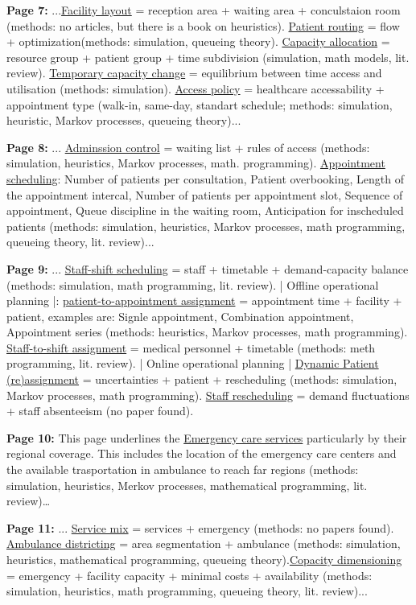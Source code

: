     \textbf{Page 7:}
    ...\underline{Facility layout} = reception area + waiting area + conculstaion room (methods: no articles, but there is a book on heuristics). \underline{Patient routing} = flow + optimization(methods: simulation, queueing theory). \underline{Capacity allocation} = resource group + patient group + time subdivision (simulation, math models, lit. review). \underline{Temporary capacity change} = equilibrium between time access and utilisation (methods: simulation). \underline{Access policy} = healthcare accessability + appointment type (walk-in, same-day, standart schedule; methods: simulation, heuristic, Markov processes, queueing theory)...
    
    \textbf{Page 8:}
    ... \underline{Adminssion control} = waiting list + rules of access (methods: simulation, heuristics, Markov processes, math. programming). \underline{Appointment scheduling}: Number of patients per consultation, Patient overbooking, Length of the appointment intercal, Number of patients per appointment slot, Sequence of appointment, Queue discipline in the waiting room, Anticipation for inscheduled patients (methods: simulation, heuristics, Markov processes, math programming, queueing theory, lit. review)... 
    
    \textbf{Page 9:}
    ... \underline{Staff-shift scheduling} = staff + timetable + demand-capacity balance (methods: simulation, math programming, lit. review). | Offline operational planning |: \underline{patient-to-appointment assignment} = appointment time + facility + patient, examples are: Signle appointment, Combination appointment, Appointment series (methods: heuristics, Markov processes, math programming). \underline{Staff-to-shift assignment} = medical personnel + timetable (methods: meth programming, lit. review). | Online operational planning | \underline{Dynamic Patient (re)assignment} = uncertainties + patient + rescheduling (methods: simulation, Markov processes, math programming). \underline{Staff rescheduling} = demand fluctuations + staff absenteeism (no paper found).
    
    \textbf{Page 10:}
    This page underlines the \underline{Emergency care services} particularly by their regional coverage. This includes the location of the emergency care centers and the available trasportation in ambulance to reach far regions (methods: simulation, heuristics, Merkov processes, mathematical programming, lit. review)\dots
    
    \textbf{Page 11:}
    ... \underline{Service mix} = services + emergency (methods: no papers found). \underline{Ambulance districting} = area segmentation + ambulance (methods: simulation, heuristics, mathematical programming, queueing theory).\underline{Copacity dimensioning} = emergency + facility capacity + minimal costs + availability (methods: simulation, heuristics, math programming, queueing theory, lit. review)...
    
